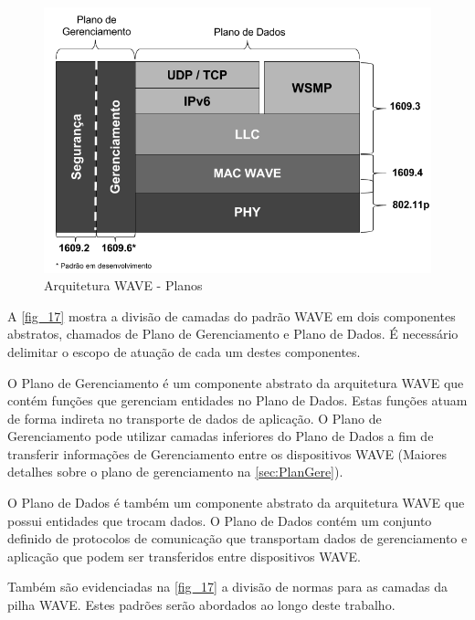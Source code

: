 \documentclass[
12pt,				%
openright,			%
oneside,			%
a4paper,			%
brazil,				%
]{abntex2}
\begin{document}
	\begin{figure} [H]
		\centering
		\includegraphics[scale=.6]{figuras/cap3/17ArquiteturaWAVEPlanos}
		\caption{\label{fig_17}Arquitetura WAVE - Planos}
	\end{figure}

	\par A \autoref{fig_17} mostra a divisão de camadas do padrão WAVE em dois componentes abstratos, chamados de Plano de Gerenciamento e Plano de Dados. É necessário delimitar o escopo de atuação de cada um destes componentes.
	
	\par O Plano de Gerenciamento é um componente abstrato da arquitetura WAVE que contém funções que gerenciam entidades no Plano de Dados. Estas funções atuam de forma indireta no transporte de dados de aplicação. O Plano de Gerenciamento pode utilizar camadas inferiores do Plano de Dados a fim de transferir informações de Gerenciamento entre os dispositivos WAVE (Maiores detalhes sobre o plano de gerenciamento na \autoref{sec:PlanGere}).
	
	\par O Plano de Dados é também um componente abstrato da arquitetura WAVE que possui entidades que trocam dados. O Plano de Dados contém um conjunto definido de protocolos de comunicação que transportam dados de gerenciamento e aplicação que podem ser transferidos entre dispositivos WAVE.
	
	\par Também são evidenciadas na \autoref{fig_17} a divisão de normas para as camadas da pilha WAVE. Estes padrões serão abordados ao longo deste trabalho.
	
\end{document}
